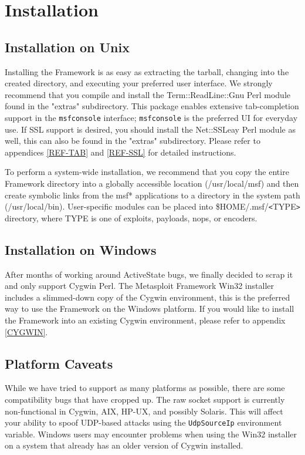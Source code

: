 \documentclass{report}
\begin{document}
\par
\pagebreak

\chapter{Installation}

    \section{Installation on Unix}
    \label{INSTALL-UNIX}
\par
Installing the Framework is as easy as extracting the tarball, changing into the
created directory, and executing your preferred user interface. We strongly
recommend that you compile and install the Term::ReadLine::Gnu Perl module found
in the "extras" subdirectory. This package enables extensive tab-completion
support in the \texttt{msfconsole} interface; \texttt{msfconsole} is the
preferred UI for everyday use.  If SSL support is desired, you should install
the Net::SSLeay Perl module as well, this can also be found in the "extras"
subdirectory.  Please refer to appendices \ref{REF-TAB} and \ref{REF-SSL} for
detailed instructions.

\par
To perform a system-wide installation, we recommend that you copy the entire
Framework directory into a globally accessible location (/usr/local/msf) and
then create symbolic links from the msf* applications to a directory in the
system path (/usr/local/bin). User-specific modules can be placed into
\$HOME/.msf/\verb#<#TYPE\verb#># directory, where TYPE is one of exploits,
payloads, nops, or encoders. 

    \section{Installation on Windows}
    \label{INSTALL-WIN32}
\par
After months of working around ActiveState bugs, we finally decided to scrap it
and only support Cygwin Perl. The Metasploit Framework Win32 installer includes a
slimmed-down copy of the Cygwin environment, this is the preferred way to use
the Framework on the Windows platform. If you would like to install the
Framework into an existing Cygwin environment, please refer to appendix
\ref{CYGWIN}.
   
    \section{Platform Caveats}
    \label{INSTALL-CAVEAT}
\par
While we have tried to support as many platforms as possible, there are some
compatibility bugs that have cropped up. The raw socket support is currently
non-functional in Cygwin, AIX, HP-UX, and possibly Solaris. This will affect
your ability to spoof UDP-based attacks using the \texttt{UdpSourceIp}
environment variable. Windows users may encounter problems when using the Win32
installer on a system that already has an older version of Cygwin installed. 
\end{document}
